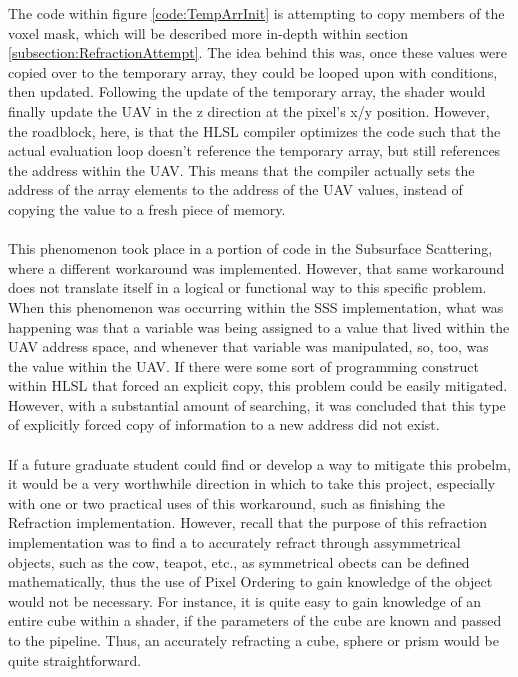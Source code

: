 \documentclass[a4paper, 12pt]{article}
\begin{document}
\noindent The code within figure \ref{code:TempArrInit} is attempting to copy
members of the voxel mask, which will be described more in-depth within
section \ref{subsection:RefractionAttempt}. The idea behind this was, once
these values were copied over to the temporary array, they could be looped
upon with conditions, then updated. Following the update of the temporary
array, the shader would finally update the UAV in the z direction at the
pixel's x/y position. However, the roadblock, here, is that the HLSL compiler
optimizes the code such that the actual evaluation loop doesn't reference the
temporary array, but still references the address within the UAV. This means
that the compiler actually sets the address of the array elements to the
address of the UAV values, instead of copying the value to a fresh piece of
memory. \\ \\ This phenomenon took place in a portion of code in the
Subsurface Scattering, where a different workaround was implemented. However,
that same workaround does not translate itself in a logical or functional way
to this specific problem. When this phenomenon was occurring within the SSS
implementation, what was happening was that a variable was being assigned to a
value that lived within the UAV address space, and whenever that variable was
manipulated, so, too, was the value within the UAV. If there were some sort of
programming construct within HLSL that forced an explicit copy, this problem
could be easily mitigated. However, with a substantial amount of searching, it
was concluded that this type of explicitly forced copy of information to a new
address did not exist. \\ \\ If a future graduate student could find or
develop a way to mitigate this probelm, it would be a very worthwhile
direction in which to take this project, especially with one or two practical
uses of this workaround, such as finishing the Refraction implementation.
However, recall that the purpose of this refraction implementation was to find
a to accurately refract through assymmetrical objects, such as the cow,
teapot, etc., as symmetrical obects can be defined mathematically, thus the
use of Pixel Ordering to gain knowledge of the object would not be necessary.
For instance, it is quite easy to gain knowledge of an entire cube within a
shader, if the parameters of the cube are known and passed to the pipeline.
Thus, an accurately refracting a cube, sphere or prism would be quite
straightforward.
\end{document}
